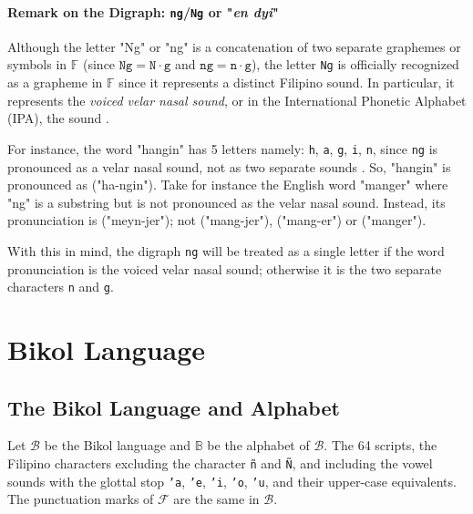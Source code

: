 \paragraph{Remark on the Digraph: \texttt{ng}/\texttt{Ng} or "\textit{en dyi}"}
\label{digraph_remark}

Although the letter "Ng" or "ng" is a concatenation of two separate graphemes or
symbols in \(\mathbb{F}\) (since \(\texttt{Ng} = \texttt{N}\cdot\texttt{g}\) and
\(\texttt{ng} = \texttt{n}\cdot\texttt{g}\)), the letter \texttt{Ng} is officially recognized
as a grapheme in \(\mathbb{F}\) since it represents a distinct Filipino sound.
In particular, it represents the \textit{voiced velar nasal sound}, or in the International
Phonetic Alphabet (IPA), the  sound \cite{Malabonga_2009}.

For instance, the word "hangin" has 5 letters namely: \texttt{h}, \texttt{a}, \texttt{g}, \texttt{i}, \texttt{n},
since \texttt{ng} is pronounced as a velar nasal sound, not as two separate sounds
. So, "hangin" is pronounced as  ("ha-ngin").
Take for instance the English  word "manger" where "ng" is a substring
but is not pronounced as the velar nasal sound. Instead, its pronunciation is
 ("meyn-jer"); not
 ("mang-jer"),
 ("mang-er") or
 ("manger").

With this in mind, the digraph \texttt{ng} will be treated as a single letter if the word pronunciation is the voiced velar nasal sound; otherwise it is the two separate characters \texttt{n} and \texttt{g}.

\section{Bikol Language}
\subsection{The Bikol Language and Alphabet}
Let $\mathcal{B}$ be the Bikol language and $\mathbb{B}$ be the alphabet of $\mathcal{B}$. The 64 scripts, the Filipino characters excluding the character \texttt{ñ} and \texttt{Ñ}, and including the vowel sounds with the glottal stop \texttt{'a}, \texttt{'e}, \texttt{'i}, \texttt{'o},  \texttt{'u}, and their upper-case equivalents. The punctuation marks of $\mathcal{F}$ are the same in $\mathcal{B}$.

